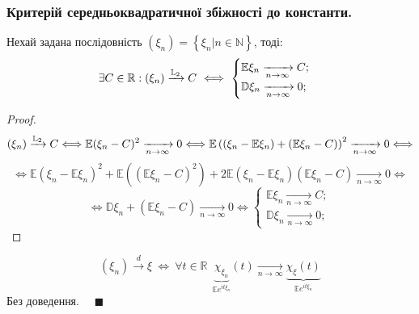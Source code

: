 \subsubsection{Критерій середньоквадратичної збіжності до константи.}
\begin{boxteo} Нехай задана послідовність $(\xi_n) = \left\lbrace \xi_n \Big| n \in \mathbb{N} \right\rbrace$, тоді:
  $$
  \exists C \in \mathbb{R} : (\xi_n) \xrightarrow[]{\mathbb{L}_2} C \ \Longleftrightarrow \  \begin{cases}
   \mathbb{E} \xi_n \xrightarrow[n\to\infty]{} C; \\
   \mathbb{D} \xi_n \xrightarrow[n\to\infty]{} 0;
  \end{cases}
  $$
\end{boxteo}
\begin{proof}
 $$
 (\xi_n) \xrightarrow{ \mathbb{L}_2 } C \Longleftrightarrow  \mathbb{E} (\xi_n - C)^2  \xrightarrow[n\to\infty]{} 0 \Longleftrightarrow \mathbb{E} \left( \left( \xi_n  - \mathbb{E} \xi_n \right) + (\mathbb{E} \xi_n - C) \right)^2 \xrightarrow[n\to\infty]{} 0  \Longleftrightarrow
 $$
 $$
 \Longleftrightarrow \mathbb{E} (\xi_n - \mathbb{E} \xi_n)^2 + \mathbb{E}\left(  (\mathbb{E}\xi_n - C)^2 \right) + 2 \mathbb{E}(\xi_n - \mathbb{E}\xi_n) (\mathbb{E}\xi_n - C) \xrightarrow[n\to\infty]{} 0  \Longleftrightarrow
 $$
 $$
  \Longleftrightarrow \mathbb{D} \xi_n + ( \mathbb{E}\xi_n - C)  \xrightarrow[n\to\infty]{} 0 \Longleftrightarrow \begin{cases}
   \mathbb{E} \xi_n \xrightarrow[n\to\infty]{} C; \\
   \mathbb{D} \xi_n \xrightarrow[n\to\infty]{} 0;
  \end{cases}
  $$
\end{proof}

\begin{boxteo}
$$
(\xi_n) \xrightarrow{d} \xi \ \Longleftrightarrow \ \forall t \in \mathbb{R} \ \  \underbrace{\chi_{\xi_n}}_{\mathbb{E} e ^{it \xi_n}} (t) \xrightarrow[n\to\infty]{}  \underbrace{\chi_{\xi}(t)}_{\mathbb{E} e ^{it \xi_n}}
$$
Без доведення. \ \ $\blacksquare$
\end{boxteo}
